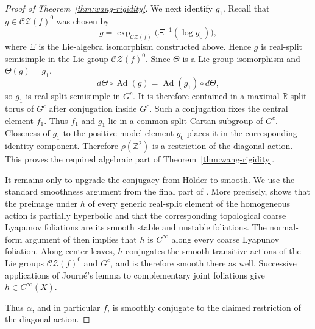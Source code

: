 \documentclass[11pt]{amsart}
\numberwithin{equation}{section}
\newcommand{\CZ}{\mathcal{CZ}}
\theoremstyle{plain}
\begin{document}
\begin{proof}[Proof of Theorem~\ref{thm:wang-rigidity}]
We next identify $g_1$.  Recall that $g\in\CZ(f)^0$ was chosen by
\[
g
=
\exp_{\CZ(f)}
\bigl(\Xi^{-1}(\log g_0)\bigr),
\]
where $\Xi$ is the Lie-algebra isomorphism constructed above.  Hence $g$
is real-split semisimple in the Lie group $\CZ(f)^0$.  Since $\Theta$ is
a Lie-group isomorphism and $\Theta(g)=g_1$,
\[
d\Theta\circ\operatorname{Ad}(g)
=
\operatorname{Ad}(g_1)\circ d\Theta,
\]
so $g_1$ is real-split semisimple in $G^c$.  It is therefore contained in
a maximal $\mathbb R$-split torus of $G^c$ after conjugation inside
$G^c$.  Such a conjugation fixes the central element $f_1$.  Thus
$f_1$ and $g_1$ lie in a common split Cartan subgroup of $G^c$.
Closeness of $g_1$ to the positive model element $g_0$ places it in the
corresponding identity component.  Therefore
$\rho(\mathbb Z^2)$ is a restriction of the diagonal action.  This proves
the required algebraic part of Theorem~\ref{thm:wang-rigidity}.

It remains only to upgrade the conjugacy from H\"older to smooth.  We use
the standard smoothness argument from the final part of
\cite{Wang26}.  More precisely, \cite[Proposition~6.11]{Wang26} shows
that the preimage under $h$ of every generic real-split element of the
homogeneous action is partially hyperbolic and that the corresponding
topological coarse Lyapunov foliations are its smooth stable and unstable
foliations.  The normal-form argument of
\cite[Section~2.2.3, Step~4]{KS} then implies that $h$ is
$C^\infty$ along every coarse Lyapunov foliation.  Along center leaves,
$h$ conjugates the smooth transitive actions of the Lie groups
$\CZ(f)^0$ and $G^c$, and is therefore smooth there as well.  Successive
applications of Journ\'e's lemma \cite{Journe} to complementary joint
foliations give $
h\in C^\infty(X).
$

Thus $\alpha$, and in particular $f$, is smoothly conjugate to the
claimed restriction of the diagonal action.
\end{proof}





\raggedbottom


\end{document}
